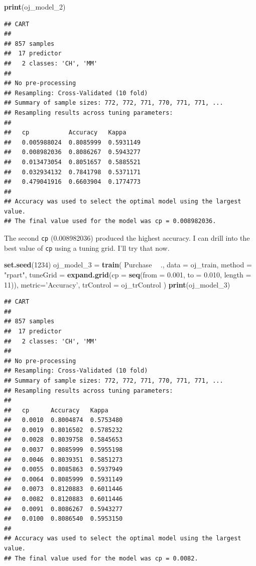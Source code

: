 \documentclass[]{book}
\newenvironment{Shaded}{\begin{snugshade}}{\end{snugshade}}
\newcommand{\DataTypeTok}[1]{\textcolor[rgb]{0.13,0.29,0.53}{#1}}
\newcommand{\DecValTok}[1]{\textcolor[rgb]{0.00,0.00,0.81}{#1}}
\newcommand{\FloatTok}[1]{\textcolor[rgb]{0.00,0.00,0.81}{#1}}
\newcommand{\KeywordTok}[1]{\textcolor[rgb]{0.13,0.29,0.53}{\textbf{#1}}}
\newcommand{\NormalTok}[1]{#1}
\newcommand{\OperatorTok}[1]{\textcolor[rgb]{0.81,0.36,0.00}{\textbf{#1}}}
\newcommand{\StringTok}[1]{\textcolor[rgb]{0.31,0.60,0.02}{#1}}
\begin{document}
\begin{Shaded}
\begin{Highlighting}[]
\KeywordTok{print}\NormalTok{(oj_model_}\DecValTok{2}\NormalTok{)}
\end{Highlighting}
\end{Shaded}

\begin{verbatim}
## CART 
## 
## 857 samples
##  17 predictor
##   2 classes: 'CH', 'MM' 
## 
## No pre-processing
## Resampling: Cross-Validated (10 fold) 
## Summary of sample sizes: 772, 772, 771, 770, 771, 771, ... 
## Resampling results across tuning parameters:
## 
##   cp           Accuracy   Kappa    
##   0.005988024  0.8085999  0.5931149
##   0.008982036  0.8086267  0.5943277
##   0.013473054  0.8051657  0.5885521
##   0.032934132  0.7841798  0.5371171
##   0.479041916  0.6603904  0.1774773
## 
## Accuracy was used to select the optimal model using the largest value.
## The final value used for the model was cp = 0.008982036.
\end{verbatim}

The second \texttt{cp} (0.008982036) produced the highest accuracy. I can drill into the best value of \texttt{cp} using a tuning grid. I'll try that now.

\begin{Shaded}
\begin{Highlighting}[]
\KeywordTok{set.seed}\NormalTok{(}\DecValTok{1234}\NormalTok{)}
\NormalTok{oj_model_}\DecValTok{3}\NormalTok{ =}\StringTok{ }\KeywordTok{train}\NormalTok{(}
\NormalTok{   Purchase }\OperatorTok{~}\StringTok{ }\NormalTok{., }
   \DataTypeTok{data =}\NormalTok{ oj_train, }
   \DataTypeTok{method =} \StringTok{"rpart"}\NormalTok{,}
   \DataTypeTok{tuneGrid =} \KeywordTok{expand.grid}\NormalTok{(}\DataTypeTok{cp =} \KeywordTok{seq}\NormalTok{(}\DataTypeTok{from =} \FloatTok{0.001}\NormalTok{, }\DataTypeTok{to =} \FloatTok{0.010}\NormalTok{, }\DataTypeTok{length =} \DecValTok{11}\NormalTok{)),  }
   \DataTypeTok{metric=}\StringTok{'Accuracy'}\NormalTok{,}
   \DataTypeTok{trControl =}\NormalTok{ oj_trControl}
\NormalTok{   )}
\KeywordTok{print}\NormalTok{(oj_model_}\DecValTok{3}\NormalTok{)}
\end{Highlighting}
\end{Shaded}

\begin{verbatim}
## CART 
## 
## 857 samples
##  17 predictor
##   2 classes: 'CH', 'MM' 
## 
## No pre-processing
## Resampling: Cross-Validated (10 fold) 
## Summary of sample sizes: 772, 772, 771, 770, 771, 771, ... 
## Resampling results across tuning parameters:
## 
##   cp      Accuracy   Kappa    
##   0.0010  0.8004874  0.5753480
##   0.0019  0.8016502  0.5785232
##   0.0028  0.8039758  0.5845653
##   0.0037  0.8085999  0.5955198
##   0.0046  0.8039351  0.5851273
##   0.0055  0.8085863  0.5937949
##   0.0064  0.8085999  0.5931149
##   0.0073  0.8120883  0.6011446
##   0.0082  0.8120883  0.6011446
##   0.0091  0.8086267  0.5943277
##   0.0100  0.8086540  0.5953150
## 
## Accuracy was used to select the optimal model using the largest value.
## The final value used for the model was cp = 0.0082.
\end{verbatim}
\end{document}
